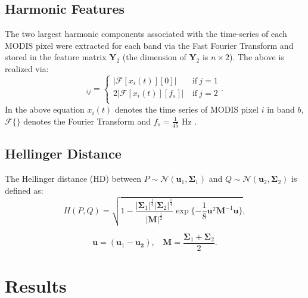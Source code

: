 \documentclass{article}
\begin{document}
\subsection{Harmonic Features}
\label{sec:fft}
The two largest harmonic components associated with the time-series of each MODIS pixel were extracted for each band via the Fast Fourier Transform and stored 
in the feature matrix $\mathbf{Y}_2$ (the dimension of $\mathbf{Y}_2$ is $n\times 2$). The above is realized via:
\begin{equation}
[\mathbf{Y}_2]_{ij} =
\begin{cases}
|\mathcal{F}[x_i(t)][0]|&~\textrm{if}~j=1\\
2|\mathcal{F}[x_i(t)][f_s]|&~\textrm{if}~j=2\\
\end{cases}.
\end{equation}
In the above equation $x_i(t)$ denotes the time series of MODIS pixel $i$ in band $b$, $\mathcal{F}\{\}$ denotes the Fourier Transform and $f_s = \frac{1}{45}$ Hz \cite{grobler2012}.

\subsection{Hellinger Distance}
\label{sec:HD}
The Hellinger distance (HD) between $P\sim\mathcal{N}(\mathbf{u}_1,\mathbf{\Sigma}_1)$ and $Q\sim\mathcal{N}(\mathbf{u}_2,\mathbf{\Sigma}_2)$ is defined as:
\begin{equation}
\label{eq:HD}
H(P,Q) = \sqrt{1 - \frac{|\mathbf{\Sigma}_1|^{\frac{1}{4}}|\mathbf{\Sigma}_2|^{\frac{1}{4}}}{|\mathbf{M}|^{\frac{1}{2}}}\exp \{-\frac{1}{8}\mathbf{u}^T\mathbf{M}^{-1}\mathbf{u}\}},
\end{equation}

\begin{equation}
\mathbf{u} = (\mathbf{u}_1-\mathbf{u_2}),~~~~\mathbf{M} = \frac{\mathbf{\Sigma}_1 + \mathbf{\Sigma}_2}{2}. 
\end{equation}

\section{Results}
\end{document}
